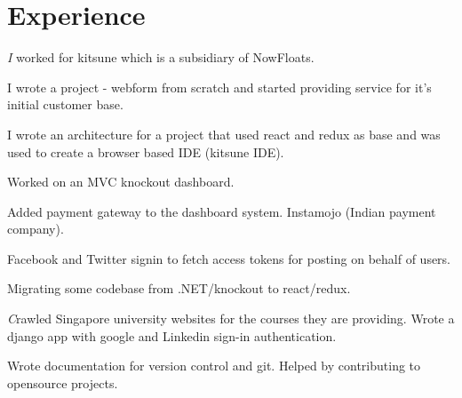 \documentclass[]{deedy-resume-openfont}
\begin{document}
\begin{minipage}[t]{0.66\textwidth}


\section{Experience}


\vspace{\topsep} %
\begin{tightemize}
\item \emph I worked for kitsune which is a subsidiary of NowFloats.
\item I wrote a project - webform from scratch and started providing service for it's initial customer base.
\item I wrote an architecture for a project that used react and redux as base and was used to create a browser based IDE (kitsune IDE).
\end{tightemize}
\sectionsep


\begin{tightemize}
\item Worked on an MVC knockout dashboard.
\item Added payment gateway to the dashboard system. Instamojo (Indian payment company).
\item Facebook and Twitter signin to fetch access tokens for posting on behalf of users.
\item Migrating some codebase from .NET/knockout to react/redux.
\vspace{\topsep} %
\end{tightemize}

\begin{tightemize}
\item \emph Crawled Singapore university websites for the courses they are providing. Wrote a django app with google and Linkedin sign-in authentication. \end{tightemize}
\sectionsep

\vspace{\topsep} %
\begin{tightemize}
\item Wrote documentation for version control and git. Helped by contributing to opensource projects.\end{tightemize}
\sectionsep


\end{minipage}
\end{document}
